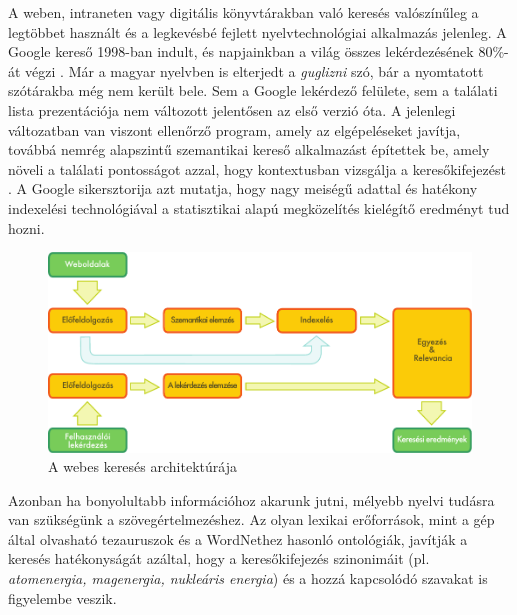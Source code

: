 \begin{multicols}{2}
A weben, intraneten vagy digitális könyv\-tá\-rak\-ban való keresés valószínűleg a leg\-töb\-bet használt és a legkevésbé fejlett nyelv\-tech\-no\-ló\-giai alkalmazás jelenleg. A Google kereső 1998-ban indult, és napjainkban a világ összes lekérdezésének 80\%-át végzi \cite{spi1}. Már a magyar nyelvben is elterjedt a \textit{guglizni} szó, bár a nyomtatott szótárakba még nem került bele. Sem a Google lekérdező felülete, sem a találati lista prezentációja nem változott jelentősen az első verzió óta. A jelenlegi változatban van viszont ellenőrző program, amely az elgépeléseket javítja, továbbá nemrég alapszintű szemantikai kereső alkalmazást építettek be, amely növeli a találati pontosságot azzal, hogy kontextusban vizsgálja a keresőkifejezést \cite{pc1}. A Google sikersztorija azt mutatja, hogy nagy meiségű adattal és hatékony indexelési technológiával a statisztikai alapú megközelítés kielégítő eredményt tud hozni. 

\begin{figure}[htb]
  \center
  \includegraphics[width=\textwidth]{../_media/hungarian/web_search_architecture}
  \caption{A webes keresés architektúrája}
  \label{fig:websearcharch_de}
\end{figure}

Azonban ha bonyolultabb információhoz akarunk jutni, mélyebb nyelvi tudásra van szükségünk a szövegértelmezéshez. Az olyan lexikai erőforrások, mint a gép által olvasható tezauruszok és a WordNethez hasonló ontológiák, javítják a keresés hatékonyságát azáltal, hogy a keresőkifejezés szinonimáit (pl. \textit{atomenergia, mag\-ener\-gia, nukleáris energia}) és a hozzá kapcsolódó szavakat is figyelembe veszik. 


\end{multicols}
